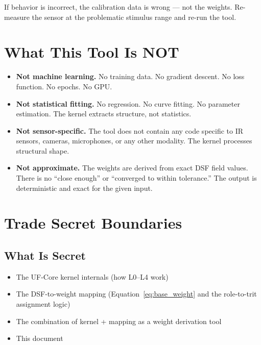 \documentclass[11pt,a4paper]{article}
\begin{document}
If behavior is incorrect, the calibration data is wrong --- not the
weights. Re-measure the sensor at the problematic stimulus range
and re-run the tool.

\section{What This Tool Is NOT}

\begin{itemize}[nosep]
\item \textbf{Not machine learning.} No training data. No gradient
      descent. No loss function. No epochs. No GPU.
\item \textbf{Not statistical fitting.} No regression. No curve
      fitting. No parameter estimation. The kernel extracts
      structure, not statistics.
\item \textbf{Not sensor-specific.} The tool does not contain any
      code specific to IR sensors, cameras, microphones, or any
      other modality. The kernel processes structural shape.
\item \textbf{Not approximate.} The weights are derived from exact
      DSF field values. There is no ``close enough'' or
      ``converged to within tolerance.'' The output is deterministic
      and exact for the given input.
\end{itemize}

\section{Trade Secret Boundaries}

\subsection{What Is Secret}

\begin{itemize}[nosep]
\item The UF-Core kernel internals (how L0--L4 work)
\item The DSF-to-weight mapping (Equation~\ref{eq:base_weight} and
      the role-to-trit assignment logic)
\item The combination of kernel + mapping as a weight derivation tool
\item This document
\end{itemize}
\end{document}

